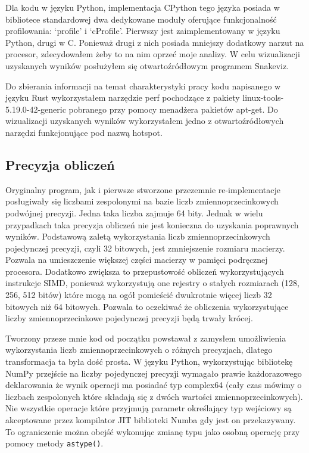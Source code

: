 \documentclass[11pt, a4paper]{article}
\newcommand{\code}[1]{\texttt{#1}}
\begin{document}
\begin{sloppypar}
    Dla kodu w języku Python, implementacja CPython tego języka posiada w bibliotece
    standardowej dwa dedykowane moduły oferujące funkcjonalność profilowania: `profile' i
    `cProfile'. Pierwszy jest zaimplementowany w języku Python, drugi w C. Ponieważ
    drugi z nich posiada mniejszy dodatkowy narzut na procesor, zdecydowałem żeby to na nim
    oprzeć moje analizy. W celu wizualizacji uzyskanych wyników posłużyłem się
    otwartoźródłowym programem Snakeviz\cite{Snakeviz_PyPI}.

    Do zbierania informacji na temat charakterystyki pracy kodu napisanego w języku Rust
    wykorzystałem narzędzie perf pochodzące z pakiety linux-tools-5.19.0-42-generic
    pobranego przy pomocy menadżera pakietów apt-get. Do wizualizacji uzyskanych wyników
    wykorzystałem jedno z otwartoźródłowych narzędzi funkcjonujące pod nazwą hotspot\cite{HOTSPOT}.

    \subsection{Precyzja obliczeń}
    Oryginalny program, jak i pierwsze stworzone przezemnie re-implementacje posługiwały
    się liczbami zespolonymi na bazie liczb zmiennoprzecinkowych podwójnej precyzji.
    Jedna taka liczba zajmuje 64 bity. Jednak w wielu przypadkach taka precyzja obliczeń
    nie jest konieczna do uzyskania poprawnych wyników. Podstawową zaletą wykorzystania
    liczb zmiennoprzecinkowych pojedynczej precyzji, czyli 32 bitowych, jest
    zmniejszenie rozmiaru macierzy. Pozwala na umieszczenie większej części macierzy w pamięci
    podręcznej procesora. Dodatkowo zwiększa to przepustowość obliczeń wykorzystujących
    instrukcje SIMD, ponieważ wykorzystują one rejestry o stałych rozmiarach (128, 256,
    512 bitów) które mogą na ogół pomieścić dwukrotnie więcej liczb 32 bitowych niż 64 bitowych.
    Pozwala to oczekiwać że obliczenia wykorzystujące liczby zmiennoprzecinkowe
    pojedynczej precyzji będą trwały krócej.

    Tworzony przeze mnie kod od początku powstawał z zamysłem umożliwienia wykorzystania
    liczb zmiennoprzecinkowych o różnych precyzjach, dlatego transformacja ta była dość prosta.
    W języku Python, wykorzystując bibliotekę NumPy przejście na liczby pojedynczej precyzji
    wymagało prawie każdorazowego deklarowania że wynik operacji ma posiadać typ complex64
    (cały czas mówimy o liczbach zespolonych które składają się z dwóch wartości
    zmiennoprzecinkowych). Nie wszystkie operacje które przyjmują parametr określający
    typ wejściowy są akceptowane przez kompilator JIT biblioteki Numba gdy jest on
    przekazywany. To ograniczenie można obejść wykonując zmianę typu jako osobną operację
    przy pomocy metody \code{astype()}.


\end{sloppypar}
\end{document}
